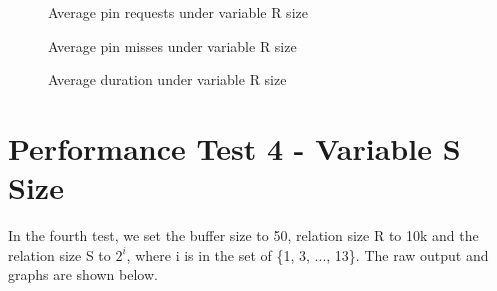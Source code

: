 \documentclass{article}
\begin{document}
\newpage
\begin{figure}[!htbp]
  \centering
  \caption{Average pin requests under variable R size}
    \label{fig: 3-1}
\end{figure}
\begin{figure}[!htbp]
  \centering
  \caption{Average pin misses under variable R size}
    \label{fig: 3-2}
\end{figure}
\begin{figure}[!htbp]
  \centering
  \caption{Average duration under variable R size}
    \label{fig: 3-3}
\end{figure}

\newpage
\section{Performance Test 4 - Variable S Size}
In the fourth test, we set the buffer size to 50, relation size R to 10k and the relation size S to $2^i$, where i is in the set of \{1, 3, ..., 13\}. The raw output and graphs are shown below. \\
\end{document}
